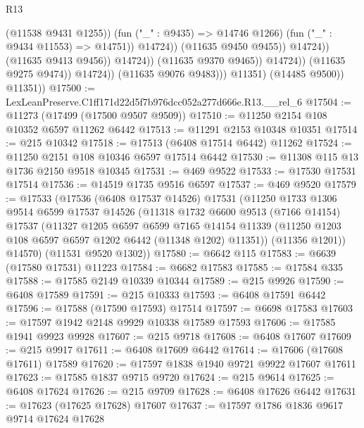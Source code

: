 \begin{lexlean}{R13}
\begin{coremodule}
                                                (@11538 @9431 @1255))
                                              (fun ("_" : @9435) => @14746 @1266)
                                              (fun ("_" : @9434 @11553) => @14751))
                                            @14724))
                                        (@11635 @9450 @9455))
                                      @14724))
                                  (@11635 @9413 @9456))
                                @14724))
                            (@11635 @9370 @9465))
                          @14724))
                      (@11635 @9275 @9474))
                    @14724))
                (@11635 @9076 @9483)))
            @11351)
          (@14485 @9500))
        @11351))
@17500 := LexLeanPreserve.C1ff171d22d5f7b976dcc052a277d666e.R13.__rel_6
@17504 := @11273 (@17499 (@17500 @9507 @9509))
@17510 := @11250 @2154 @108 @10352 @6597 @11262 @6442
@17513 := @11291 @2153 @10348 @10351
@17514 := @215 @10342
@17518 := @17513 (@6408 @17514 @6442) @11262
@17524 := @11250 @2151 @108 @10346 @6597 @17514 @6442
@17530 := @11308 @115 @13 @1736 @2150 @9518 @10345
@17531 := @469 @9522
@17533 := @17530 @17531 @17514
@17536 := @14519 @1735 @9516 @6597
@17537 := @469 @9520
@17579 := @17533
    (@17536
      (@6408 @17537 @14526)
      @17531
      (@11250
        @1733
        @1306
        @9514
        @6599
        @17537
        @14526
        (@11318
          @1732
          @6600
          @9513
          (@7166 @14154)
          @17537
          (@11327
            @1205
            @6597
            @6599
            @7165
            @14154
            @11339
            (@11250 @1203 @108 @6597 @6597 @1202 @6442 (@11348 @1202) @11351))
          (@11356 @1201))
        @14570)
      (@11531 @9520 @1302))
@17580 := @6642 @115
@17583 := @6639 (@17580 @17531) @11223
@17584 := @6682 @17583
@17585 := @17584 @335
@17588 := @17585 @2149 @10339 @10344
@17589 := @215 @9926
@17590 := @6408 @17589
@17591 := @215 @10333
@17593 := @6408 @17591 @6442
@17596 := @17588 (@17590 @17593) @17514
@17597 := @6698 @17583
@17603 := @17597 @1942 @2148 @9929 @10338 @17589 @17593
@17606 := @17585 @1941 @9923 @9928
@17607 := @215 @9718
@17608 := @6408 @17607
@17609 := @215 @9917
@17611 := @6408 @17609 @6442
@17614 := @17606 (@17608 @17611) @17589
@17620 := @17597 @1838 @1940 @9721 @9922 @17607 @17611
@17623 := @17585 @1837 @9715 @9720
@17624 := @215 @9614
@17625 := @6408 @17624
@17626 := @215 @9709
@17628 := @6408 @17626 @6442
@17631 := @17623 (@17625 @17628) @17607
@17637 := @17597 @1786 @1836 @9617 @9714 @17624 @17628

\end{coremodule}
\end{lexlean}
